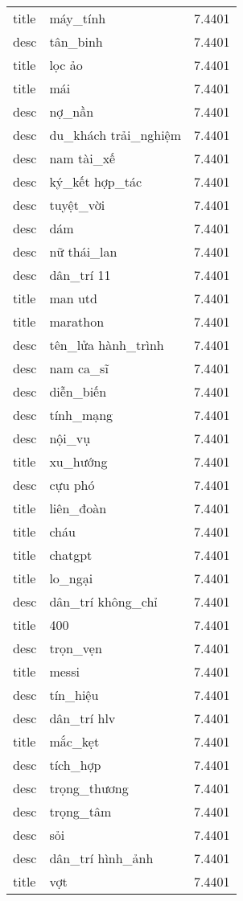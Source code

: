 \documentclass{article}
\begin{document}
\begin{tabular}{lll}
title & máy\_tính & 7.4401\\
desc & tân\_binh & 7.4401\\
title & lọc ảo & 7.4401\\
title & mái & 7.4401\\
desc & nợ\_nần & 7.4401\\
desc & du\_khách trải\_nghiệm & 7.4401\\
desc & nam tài\_xế & 7.4401\\
desc & ký\_kết hợp\_tác & 7.4401\\
desc & tuyệt\_vời & 7.4401\\
desc & dám & 7.4401\\
desc & nữ thái\_lan & 7.4401\\
desc & dân\_trí 11 & 7.4401\\
title & man utd & 7.4401\\
title & marathon & 7.4401\\
desc & tên\_lửa hành\_trình & 7.4401\\
desc & nam ca\_sĩ & 7.4401\\
desc & diễn\_biến & 7.4401\\
desc & tính\_mạng & 7.4401\\
desc & nội\_vụ & 7.4401\\
title & xu\_hướng & 7.4401\\
desc & cựu phó & 7.4401\\
title & liên\_đoàn & 7.4401\\
title & cháu & 7.4401\\
title & chatgpt & 7.4401\\
title & lo\_ngại & 7.4401\\
desc & dân\_trí không\_chỉ & 7.4401\\
title & 400 & 7.4401\\
desc & trọn\_vẹn & 7.4401\\
title & messi & 7.4401\\
desc & tín\_hiệu & 7.4401\\
desc & dân\_trí hlv & 7.4401\\
title & mắc\_kẹt & 7.4401\\
desc & tích\_hợp & 7.4401\\
desc & trọng\_thương & 7.4401\\
desc & trọng\_tâm & 7.4401\\
desc & sỏi & 7.4401\\
desc & dân\_trí hình\_ảnh & 7.4401\\
title & vợt & 7.4401\\

\end{tabular}
\end{document}
